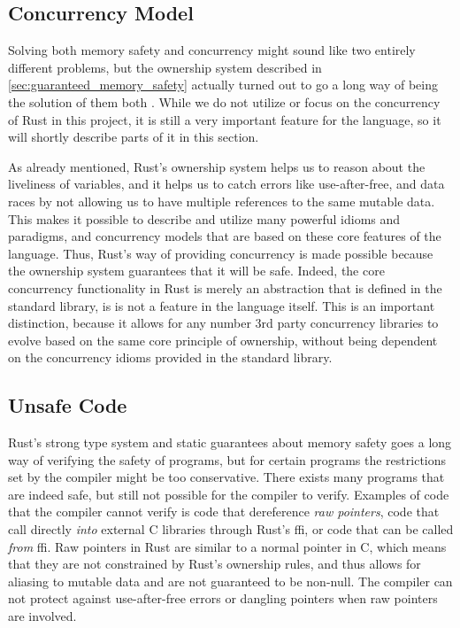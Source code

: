 \subsection{Concurrency Model} %
\label{ssub:concurrency_model}

Solving both memory safety and concurrency might sound like two entirely different problems, but the ownership system described in \autoref{sec:guaranteed_memory_safety} actually turned out to go a long way of being the solution of them both \cite{web:fearless_concurrency_with_rust}.
While we do not utilize or focus on the concurrency of Rust in this project, it is still a very important feature for the language, so it will shortly describe parts of it in this section.

As already mentioned, Rust's ownership system helps us to reason about the liveliness of variables, and it helps us to catch errors like use-after-free, and data races by not allowing us to have multiple references to the same mutable data.
This makes it possible to describe and utilize many powerful idioms and paradigms, and concurrency models that are based on these core features of the language.
Thus, Rust's way of providing concurrency is made possible because the ownership system guarantees that it will be safe.
Indeed, the core concurrency functionality in Rust is merely an abstraction that is defined in the standard library, is is not a feature in the language itself.
This is an important distinction, because it allows for any number 3rd party concurrency libraries to evolve based on the same core principle of ownership, without being dependent on the concurrency idioms provided in the standard library.

\subsection{Unsafe Code} %
\label{ssub:unsafe_code}

Rust's strong type system and static guarantees about memory safety goes a long way of verifying the safety of programs, but for certain programs the restrictions set by the compiler might be too conservative.
There exists many programs that are indeed safe, but still not possible for the compiler to verify.
Examples of code that the compiler cannot verify is code that dereference \emph{raw pointers}, code that call directly \emph{into} external C libraries through Rust's \gls{ffi}, or code that can be called \emph{from} \gls{ffi}.
Raw pointers in Rust are similar to a normal pointer in C, which means that they are not constrained by Rust's ownership rules, and thus allows for aliasing to mutable data and are not guaranteed to be non-null.
The compiler can not protect against use-after-free errors or dangling pointers when raw pointers are involved.

